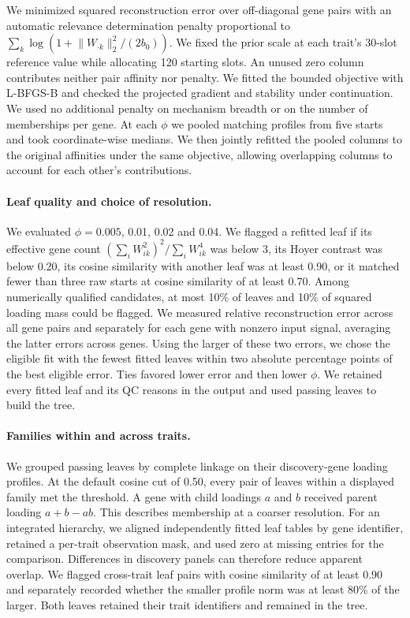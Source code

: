 \documentclass[11pt]{article}
\begin{document}
We minimized squared reconstruction error over off-diagonal gene pairs with an automatic relevance determination penalty proportional to $\sum_k\log(1+\lVert W_{\cdot k}\rVert_2^2/(2b_0))$. We fixed the prior scale at each trait's 30-slot reference value while allocating 120 starting slots. An unused zero column contributes neither pair affinity nor penalty. We fitted the bounded objective with L-BFGS-B and checked the projected gradient and stability under continuation. We used no additional penalty on mechanism breadth or on the number of memberships per gene. At each $\phi$ we pooled matching profiles from five starts and took coordinate-wise medians. We then jointly refitted the pooled columns to the original affinities under the same objective, allowing overlapping columns to account for each other's contributions.

\paragraph{Leaf quality and choice of resolution.}
We evaluated $\phi=0.005$, 0.01, 0.02 and 0.04. We flagged a refitted leaf if its effective gene count $(\sum_i W_{ik}^2)^2/\sum_i W_{ik}^4$ was below 3, its Hoyer contrast was below 0.20, its cosine similarity with another leaf was at least 0.90, or it matched fewer than three raw starts at cosine similarity of at least 0.70. Among numerically qualified candidates, at most 10\% of leaves and 10\% of squared loading mass could be flagged. We measured relative reconstruction error across all gene pairs and separately for each gene with nonzero input signal, averaging the latter errors across genes. Using the larger of these two errors, we chose the eligible fit with the fewest fitted leaves within two absolute percentage points of the best eligible error. Ties favored lower error and then lower $\phi$. We retained every fitted leaf and its QC reasons in the output and used passing leaves to build the tree.

\paragraph{Families within and across traits.}
We grouped passing leaves by complete linkage on their discovery-gene loading profiles. At the default cosine cut of 0.50, every pair of leaves within a displayed family met the threshold. A gene with child loadings $a$ and $b$ received parent loading $a+b-ab$. This describes membership at a coarser resolution. For an integrated hierarchy, we aligned independently fitted leaf tables by gene identifier, retained a per-trait observation mask, and used zero at missing entries for the comparison. Differences in discovery panels can therefore reduce apparent overlap. We flagged cross-trait leaf pairs with cosine similarity of at least 0.90 and separately recorded whether the smaller profile norm was at least 80\% of the larger. Both leaves retained their trait identifiers and remained in the tree.
\end{document}

